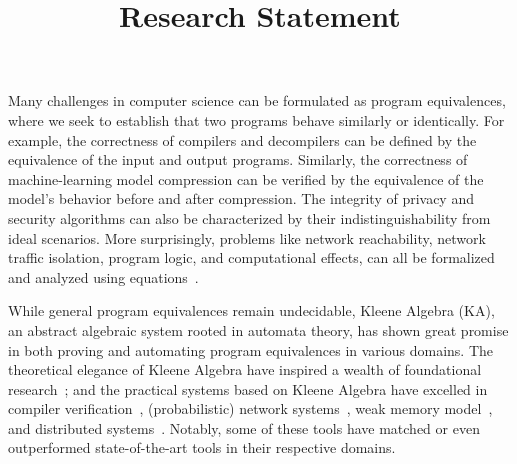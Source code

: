 \documentclass[11pt,a4paper,sans]{moderncv} %
\title{Research Statement}
\begin{document}
\makecvtitle %

\setlength\parskip{8px}
\vspace{-\parskip} 

Many challenges in computer science can be formulated as program equivalences, where we seek to establish that two programs behave similarly or identically. 
For example, the correctness of compilers and decompilers can be defined by the equivalence of the input and output programs. 
Similarly, the correctness of machine-learning model compression can be verified by the equivalence of the model's behavior before and after compression. 
The integrity of privacy and security algorithms can also be characterized by their indistinguishability from ideal scenarios. 
More surprisingly, problems like network reachability, network traffic isolation, program logic, and computational effects, can all be formalized and analyzed using equations~\cite{anderson_NetKATSemanticFoundations_2014a,zhang_IncorrectnessLogicKleene_2022,moller_AlgebraProgramCorrectness_2021,plotkin_HandlersAlgebraicEffects_2009,plotkin_AdequacyAlgebraicEffects_2001}.

While general program equivalences remain undecidable, Kleene Algebra (KA), an abstract algebraic system rooted in automata theory, has shown great promise in both proving and automating program equivalences in various domains. 
The theoretical elegance of Kleene Algebra have inspired a wealth of foundational research~\cite{smolka_GuardedKleeneAlgebra_2020,schmid_GuardedKleeneAlgebra_2021,jacobs_BialgebraicReviewDeterministic_2006,kozen_CoalgebraicTheoryKleene_2008,schmid_CoalgebraicCompletenessTheorems_2024,rozowski_ProbabilisticGuardedKAT_2023}; and the practical systems based on Kleene Algebra have excelled in compiler verification~\cite{kozen_CertificationCompilerOptimizations_2000d}, (probabilistic) network systems~\cite{anderson_NetKATSemanticFoundations_2014a,foster_CoalgebraicDecisionProcedure_2015,smolka_ScalableVerificationProbabilistic_2019,zhang_NetterProbabilisticStateful_2021}, weak memory model~\cite{kokologiannakis_KaterAutomatingWeak_2023}, and distributed systems~\cite{mciver_UsingProbabilisticKleene_2008}. 
Notably, some of these tools have matched or even outperformed state-of-the-art tools in their respective domains.
\end{document}
